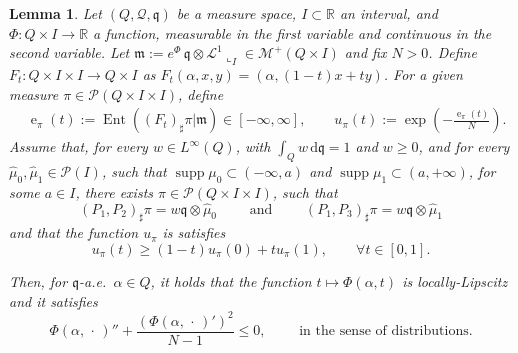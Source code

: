 \documentclass[12pt,a4paper]{amsart}
\theoremstyle{plain}
\newtheorem{lemma}{Lemma}[section]
\theoremstyle{definition}
\numberwithin{equation}{section}
\newcommand{\R}{\mathbb{R}}
\DeclareMathOperator{\Ent}{Ent}
\DeclareMathOperator{\ee}{e}
\DeclareMathOperator{\supp}{supp}
\newcommand{\de}{{\mathrm{d}}}
\newcommand{\Prob}{\mathcal P}
\newcommand{\M}{\mathcal{M}}
\newcommand{\dotargument}{\,\cdot\,}
\renewcommand{\L}{\mathcal{L}}
\newcommand{\q}{\mathfrak{q}}
\newcommand{\mm}{\mathfrak m}
\newcommand{\qq}{\mathfrak q}
\begin{document}
\begin{lemma}
\label{lem:wasserstein-mixture}
Let $(Q,\mathcal{Q},\q)$ be a measure space, $I\subset \R$ an 
interval, and
$\Phi:Q\times I\to \R$ a function, measurable in the first
variable and continuous in the second variable.
%
Let 
$\mm:=e^{\Phi}\,\q\otimes\L^1\llcorner_{I}\in\M^{+}(Q\times
  I)$ and fix $N>0$. 
  Define $F_t:Q\times I\times I\to Q\times I$ as
  $F_t(\alpha,x,y)=(\alpha,(1-t)x+t y)$.
  For a given measure $\pi\in\Prob(Q\times I\times I)$, define
  \begin{align*}
    &
      \ee_\pi(t)
      :=
      \Ent((F_t)_{\sharp}\pi|\mm)
      \in[-\infty,\infty]
      ,
      \qquad
      u_\pi(t)
      :=
      \exp
      \left(
      -\frac{\ee_\pi(t)}{N}
      \right)
      .
  \end{align*}
  Assume that, for every $w\in L^\infty(Q)$, with $\int_Q w\,\de\q=1$ and
  $w\geq 0$,
  and for every $\hat \mu_0,\hat \mu_1\in\Prob(I)$, such that $\supp
  \mu_0\subset (-\infty,a)$ and $\supp \mu_1\subset (a,+\infty)$, for
  some $a\in I$,
  there exists
  $\pi\in\Prob(Q\times I\times I)$, such that
  \begin{equation}
    (P_1, P_2)_{\sharp}\pi
    =
    w\q\otimes\hat\mu_0
    \qquad
    \text{ and }
    \qquad
    (P_1, P_3)_{\sharp}\pi
    =
    w\q\otimes\hat\mu_1
  \end{equation}
  and that the function $u_\pi$ is satisfies
  \begin{equation}\label{E:convexitylemma}
    u_\pi(t)
    \geq
    (1-t)
    u_\pi(0)
    +
    t
    u_\pi(1)
    ,
    \qquad
    \forall t\in[0,1]
    .
  \end{equation}

Then, for $\qq$-a.e.\ $\alpha\in Q$, it holds that  the function $t\mapsto \Phi(\alpha,t)$ is locally-Lipscitz and it satisfies
\begin{equation}
    \label{eq:riccati-for-fibers}
\Phi(\alpha,\dotargument)''
    +
\frac{(\Phi(\alpha,\dotargument)')^2}{N-1}
    \leq
    0
    ,
    \qquad
    \text{ in the sense of distributions.}
\end{equation}
\end{lemma}
\end{document}
